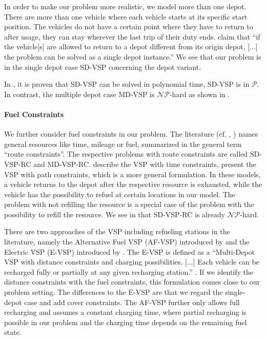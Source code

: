 In order to make our problem more realistic, we model more than one depot. There are more than one vehicle where each vehicle starts at its specific start position. The vehicles do not have a certain point where they have to return to after usage, \ie they can stay wherever the last trip of their duty ends. \cite{Daduna_Paixao} claim that \enquote{if the vehicle[s] are allowed to return to a depot different from its origin depot, [...] the problem can be solved as a single depot instance.} We see that our problem is in the single depot case SD-VSP concerning the depot variant.

In \cite{Dantzig_Fulkerson}, it is proven that SD-VSP can be solved in polynomial time, \ie SD-VSP is in $\mathcal{P}$. In contrast, the multiple depot case MD-VSP is $\mathcal{NP}$-hard as shown in \cite{Bertossi_Carraresi}.

\newpage

\paragraph{Fuel Constraints} \parfill

We further consider fuel constraints in our problem. The literature (cf. \cite{Bunte_Kliewer}, \cite{Raff}) names general resources like time, mileage or fuel, summarized in the general term \enquote{route constraints}. The respective problems with route constraints are called SD-VSP-RC and MD-VSP-RC. \cite{Freling_Paixao} describe  the VSP with time constraints, \cite{Raff} present the VSP with path constraints, which is a more general formulation. In these models, a vehicle returns to the depot after the respective resource is exhausted, while the vehicle has the possibility to refuel at certain locations in our model. The problem with not refilling the resource is a special case of the problem with the possibility to refill the resource. We see in  that SD-VSP-RC is already $\mathcal{NP}$-hard.

There are two approaches of the VSP including refueling stations in the literature, namely the Alternative Fuel VSP (AF-VSP) introduced by \cite{Adler} and the Electric VSP (E-VSP) introduced by \cite{Wen}. The E-VSP is defined as a \enquote{Multi-Depot VSP with distance constraints and charging possibilities. [...] Each vehicle can be recharged fully or partially at any given recharging station.} \cite[p.~73]{Wen}. If we identify the distance constraints with the fuel constraints, this formulation comes close to our problem setting. The differences to the E-VSP are that we regard the single-depot case and add cover constraints. The AF-VSP further only allows full recharging and assumes a constant charging time, where partial recharging is possible in our problem and the charging time depends on the remaining fuel state.

